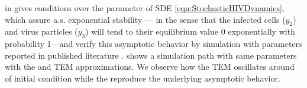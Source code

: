 \citeauthor{Dalal2008} in \cite[Thm 5.1]{Dalal2008} gives conditions over the parameter of SDE 
\eqref{eqn:StochasticHIVDynamics}, which assure a.s. exponential stability --- in the sense that
the infected cells ($y_2$) and virus particles ($y_3$) will tend to their equilibrium value 0 exponentially with 
probability 1---and verify this asymptotic behavior by
simulation 
with parameters reported in published literature \cite{Bonhoeffer1997, Callaway2002, Nelson2000, Nowak1997}.
 shows a simulation path with same parameters with the \SM and TEM approximations.
We observe how the TEM oscillates around of initial condition while the \SM reproduce the underlying asymptotic
behavior.  
